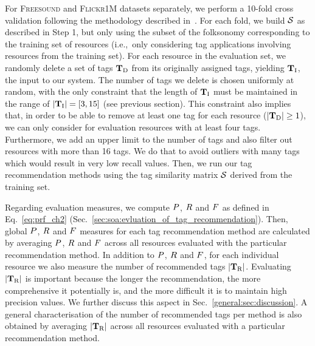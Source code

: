 For \textsc{Freesound} and \textsc{Flickr1M} datasets separately, we perform a 10-fold cross validation following the methodology described in~\cite{sal1997}. For each fold, we build $\mathcal{S}$ as described in Step 1, but only using the subset of the folksonomy corresponding to the training set of resources (i.e.,~only considering tag applications involving resources from the training set). For each resource in the evaluation set, we randomly delete a set of tags $\mathbf{T}_{\text{D}}$ from its originally assigned tags, yielding $\mathbf{T}_{\text{I}}$, the input to our system. 
The number of tags we delete is chosen uniformly at random, with the only constraint that the length of $\mathbf{T}_{\text{I}}$ must be maintained in the range of $|\mathbf{T}_{\text{I}}|=[3,15]$ (see previous section). 
This constraint also implies that, in order to be able to remove at least one tag for each resource ($|\mathbf{T}_{\text{D}}| \geq 1$), we can only consider for evaluation resources with at least four tags. Furthermore, we add an upper limit to the number of tags and also filter out resources with more than 16 tags. We do that to avoid outliers with many tags which would result in very low recall values. 
Then, we run our tag recommendation methods using the tag similarity matrix $\mathcal{S}$ derived from the training set. 

Regarding evaluation measures, we compute $P$, $R$ and $F$ as defined in Eq.~\ref{eq:prf_ch2} (Sec.~\ref{sec:soa:evluation_of_tag_recommendation}).
Then, global $P$, $R$ and $F$ measures for each tag recommendation method are calculated by averaging $P$, $R$ and $F$ across all resources evaluated with the particular recommendation method.
In addition to $P$, $R$ and $F$, for each individual resource we also measure the number of recommended tags $|\mathbf{T}_{\text{R}}|$. 
Evaluating $|\mathbf{T}_{\text{R}}|$ is important because the longer the recommendation, the more comprehensive it potentially is, and the more difficult it is to maintain high precision values. We further discuss this aspect in Sec.~\ref{general:sec:discussion}. A general characterisation of the number of recommended tags per method is also obtained by averaging $|\mathbf{T}_{\text{R}}|$ across all resources evaluated with a particular recommendation method.


